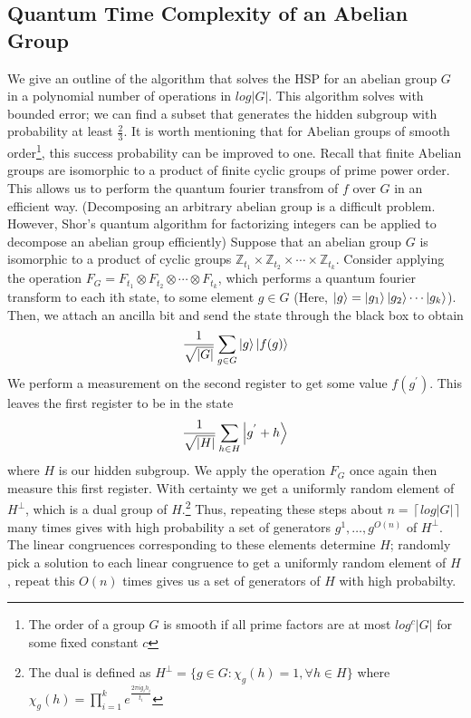 \documentclass[12pt]{article}
\theoremstyle{plain}
\theoremstyle{definition}
\begin{document}
\subsection{Quantum Time Complexity of an Abelian Group}
We give an outline of the algorithm that solves the HSP for an abelian group $G$ in a polynomial number of operations in $log|G|$. This algorithm solves with bounded error; we can find a subset that generates the hidden subgroup with probability at least $\frac{2}{3}$. It is worth mentioning that for Abelian groups of smooth order\footnote{The order of a group $G$ is smooth if all prime factors are at most $log^{c}|G|$ for some fixed constant $c$}, this success probability can be improved to one.
\newline
Recall that finite Abelian groups are isomorphic to a product of finite cyclic groups of prime power order. This allows us to perform the quantum fourier transfrom of $f$ over $G$ in an efficient way. (Decomposing an arbitrary abelian group is a difficult problem. However, Shor's quantum algorithm for factorizing integers can be applied to decompose an abelian group efficiently)
\newline
Suppose that an abelian group $G$ is isomorphic to a product of cyclic groups $\mathbb{Z}_{t_1}\times\mathbb{Z}_{t_2}\times\cdots\times\mathbb{Z}_{t_k}$. Consider applying the operation $F_G=F_{t_1}\otimes F_{t_2}\otimes\cdots\otimes F_{t_k}$, which performs a quantum fourier transform to each ith state, to some element $g\in G$ (Here, $\left\vert{g}\right\rangle=\left\vert{g_1}\right\rangle\left\vert{g_2}\right\rangle\cdots\left\vert{g_k}\right\rangle$). Then, we attach an ancilla bit and send the state through the black box to obtain 
$$\frac{1}{\sqrt{|G|}}\sum_{g\in G}\left\vert{g}\right\rangle\left\vert{f(g)}\right\rangle$$
We perform a measurement on the second register to get some value $f(g^{'})$. This leaves the first register to be in the state 
$$\frac{1}{\sqrt{|H|}}\sum_{h\in H}\left\vert{g^{'}+h}\right\rangle$$
where $H$ is our hidden subgroup. We apply the operation $F_G$ once again then measure this first register. With certainty we get a uniformly random element of $H^{\perp}$, which is a dual group of $H$.\footnote{The dual is defined as $H^{\perp}=\{g\in G:\chi_{g}(h)=1,\forall h\in H\}$ where $\chi_{g}(h)=\prod_{i=1}^{k}e^{\frac{2\pi ig_{i}h_{i}}{t_i}}$} Thus, repeating these steps about $n=\left\lceil{log|G|}\right\rceil$ many times gives with high probability a set of generators $g^{1},\ldots,g^{O(n)}$ of $H^{\perp}$. The linear congruences corresponding to these elements determine $H$; randomly pick a solution to each linear congruence to get a uniformly random element of $H$, repeat this $O(n)$ times gives us a set of generators of $H$ with high probabilty.
\end{document}
